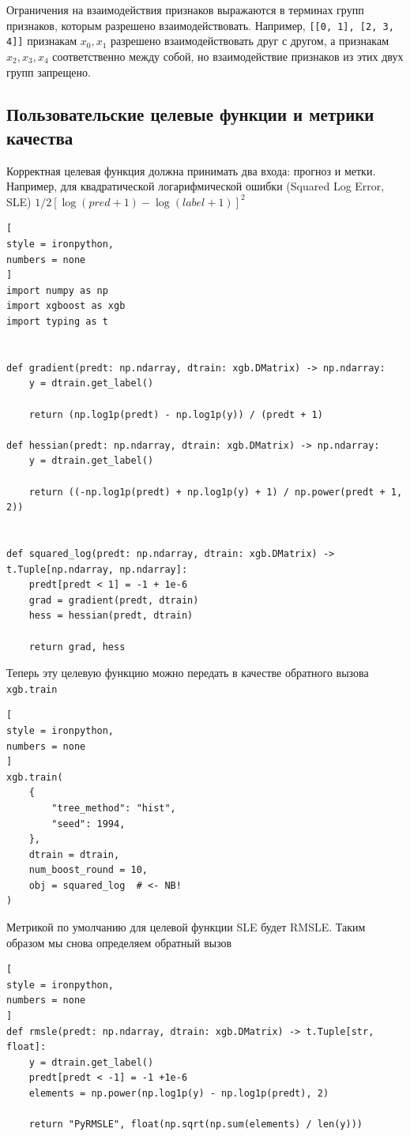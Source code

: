 \documentclass[%
	11pt,
	a4paper,
	utf8,
		]{article}
\begin{document}
Ограничения на взаимодействия признаков выражаются в терминах групп признаков, которым разрешено взаимодействовать. Например, \verb|[[0, 1], [2, 3, 4]]| признакам $ x_0, x_1 $ разрешено взаимодействовать друг с другом, а признакам $ x_2, x_3, x_4 $ соответственно между собой, но взаимодействие признаков из этих двух групп запрещено.


\subsection{Пользовательские целевые функции и метрики качества}

Корректная целевая функция должна принимать два входа: прогноз и метки. Например, для квадратической логарифмической ошибки (Squared Log Error, SLE) $ 1 / 2 [\log (pred + 1) - \log(label +1)]^2 $
\begin{lstlisting}[
style = ironpython,
numbers = none
]
import numpy as np
import xgboost as xgb
import typing as t


def gradient(predt: np.ndarray, dtrain: xgb.DMatrix) -> np.ndarray:
	y = dtrain.get_label()

	return (np.log1p(predt) - np.log1p(y)) / (predt + 1)

def hessian(predt: np.ndarray, dtrain: xgb.DMatrix) -> np.ndarray:
	y = dtrain.get_label()

	return ((-np.log1p(predt) + np.log1p(y) + 1) / np.power(predt + 1, 2))


def squared_log(predt: np.ndarray, dtrain: xgb.DMatrix) -> t.Tuple[np.ndarray, np.ndarray]:
	predt[predt < 1] = -1 + 1e-6
	grad = gradient(predt, dtrain)
	hess = hessian(predt, dtrain)
	
	return grad, hess
\end{lstlisting}

Теперь эту целевую функцию можно передать в качестве обратного вызова \verb|xgb.train|
\begin{lstlisting}[
style = ironpython,
numbers = none
]
xgb.train(
    {
        "tree_method": "hist",
        "seed": 1994,
    },
    dtrain = dtrain,
    num_boost_round = 10,
    obj = squared_log  # <- NB!
)
\end{lstlisting}

Метрикой по умолчанию для целевой функции SLE будет RMSLE. Таким образом мы снова определяем обратный вызов
\begin{lstlisting}[
style = ironpython,
numbers = none
]
def rmsle(predt: np.ndarray, dtrain: xgb.DMatrix) -> t.Tuple[str, float]:
    y = dtrain.get_label()
    predt[predt < -1] = -1 +1e-6
    elements = np.power(np.log1p(y) - np.log1p(predt), 2)
    
    return "PyRMSLE", float(np.sqrt(np.sum(elements) / len(y)))
\end{lstlisting}
\end{document}
